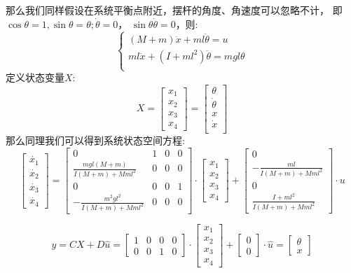 \documentclass{article}
\begin{document}
那么我们同样假设在系统平衡点附近，摆杆的角度、角速度可以忽略不计，
即 $\cos\theta=1,\sin\theta=\theta;\dot{\theta} = 0$，
$\sin\theta\dot{\theta} = 0$，则:
\[
\left\{\begin{matrix}
    (M+m)\ddot{x}+ml\ddot{\theta} = u \\
    ml\ddot{x}+(I+ml^2)\ddot{\theta} = mgl\theta \\
\end{matrix}
\right.
\]
定义状态变量$X$:
\[
X = \begin{bmatrix}
    x_1\\x_2\\x_3\\x_4
\end{bmatrix} = \begin{bmatrix}
    \theta \\ \dot{\theta}\\x \\ \dot{x} \\ 
\end{bmatrix}
\]
那么同理我们可以得到系统状态空间方程:
\[
\begin{bmatrix}
\dot{x_1}\\\dot{x_2}\\\dot{x_3}\\\dot{x_4}    
\end{bmatrix}
=
\begin{bmatrix}
0&1&0&0\\
\frac{mgl(M+m)}{I(M+m)+Mml^2}&0&0&0\\
0&0&0&1\\
-\frac{m^2gl^2}{I(M+m)+Mml^2}&0&0&0
\end{bmatrix}\cdot
\begin{bmatrix}
    x_1\\x_2\\x_3\\x_4
\end{bmatrix} + 
\begin{bmatrix}
0\\
-\frac{ml}{I(M+m)+Mml^2}\\
0\\
\frac{I+ml^2}{I(M+m)+Mml^2}
\end{bmatrix}\cdot u 
\]

\[
y=CX+D\hat{u}=\begin{bmatrix}
    1&0&0&0\\
    0&0&1&0
\end{bmatrix} \cdot
\begin{bmatrix}
    x_1\\x_2\\x_3\\x_4
\end{bmatrix}+\begin{bmatrix}
    0\\0
\end{bmatrix}\cdot \hat{u}=
\begin{bmatrix}
   \theta \\ x
\end{bmatrix}
\]
\end{document}
